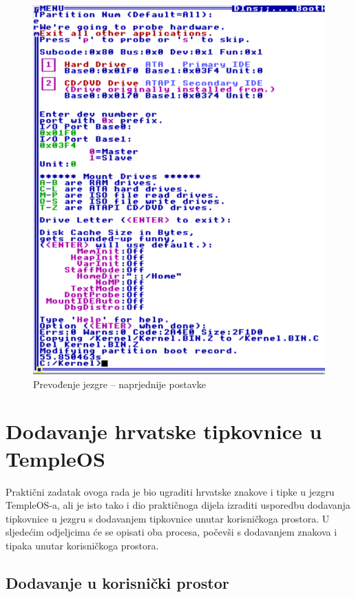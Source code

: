 \documentclass{foi}
\begin{document}
\begin{figure}[H]
    \centering
    \includegraphics[width=1.0\textwidth]{slike/kernelcomp2.png}
	\caption{Prevođenje jezgre – naprjednije postavke}
    \label{fig:kernelcomp2}
\end{figure}

\chapter{Dodavanje hrvatske tipkovnice u TempleOS}

Praktični zadatak ovoga rada je bio ugraditi hrvatske znakove i tipke u jezgru TempleOS-a, ali je isto tako i dio praktičnoga dijela izraditi usporedbu dodavanja tipkovnice u jezgru s dodavanjem tipkovnice unutar korisničkoga prostora. U sljedećim odjeljcima će se opisati oba procesa, počevši s dodavanjem znakova i tipaka unutar korisničkoga prostora.

\section{Dodavanje u korisnički prostor}
\end{document}
